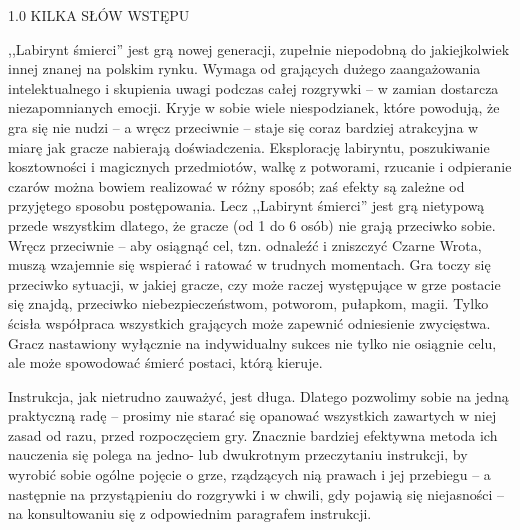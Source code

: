 1.0 KILKA SŁÓW WSTĘPU

,,Labirynt śmierci'' jest grą nowej generacji, zupełnie niepodobną do jakiejkolwiek innej znanej na polskim rynku.
Wymaga od grających dużego zaangażowania intelektualnego i skupienia uwagi podczas całej rozgrywki – w zamian dostarcza niezapomnianych emocji.
Kryje w sobie wiele niespodzianek, które powodują, że gra się nie nudzi – a wręcz przeciwnie – staje się coraz bardziej atrakcyjna w miarę jak gracze nabierają doświadczenia.
Eksplorację labiryntu, poszukiwanie kosztowności i magicznych przedmiotów, walkę z potworami, rzucanie i odpieranie czarów można bowiem realizować w różny sposób; zaś efekty są zależne od przyjętego sposobu postępowania.
Lecz ,,Labirynt śmierci'' jest grą nietypową przede wszystkim dlatego, że gracze (od 1 do 6 osób) nie grają przeciwko sobie.
Wręcz przeciwnie – aby osiągnąć cel, tzn. odnaleźć i zniszczyć Czarne Wrota, muszą wzajemnie się wspierać i ratować w trudnych momentach.
Gra toczy się przeciwko sytuacji, w jakiej gracze, czy może raczej występujące w grze postacie się znajdą, przeciwko niebezpieczeństwom, potworom, pułapkom, magii.
Tylko ścisła współpraca wszystkich grających może zapewnić odniesienie zwycięstwa.
Gracz nastawiony wyłącznie na indywidualny sukces nie tylko nie osiągnie celu, ale może spowodować śmierć postaci, którą kieruje.

Instrukcja, jak nietrudno zauważyć, jest długa.
Dlatego pozwolimy sobie na jedną praktyczną radę – prosimy nie starać się opanować wszystkich zawartych w niej zasad od razu, przed rozpoczęciem gry.
Znacznie bardziej efektywna metoda ich nauczenia się polega na jedno- lub dwukrotnym przeczytaniu instrukcji, by wyrobić sobie ogólne pojęcie o grze, rządzących nią prawach i jej przebiegu – a następnie na przystąpieniu do rozgrywki i w chwili, gdy pojawią się niejasności – na konsultowaniu się z odpowiednim paragrafem instrukcji.
